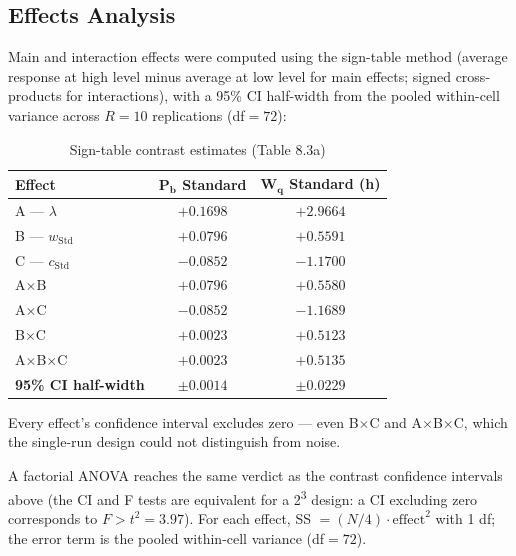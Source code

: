 \documentclass[11pt,a4paper]{article}
\newcommand{\Wq}{\ensuremath{W_q}}
\newcommand{\Pb}{\ensuremath{P_b}}
\newcommand{\lam}{\ensuremath{\lambda}}
\begin{document}
\subsection{Effects Analysis}

Main and interaction effects were computed using the sign-table method (average response at high level
minus average at low level for main effects; signed cross-products for interactions), with a 95\% CI
half-width from the pooled within-cell variance across $R=10$ replications (df$=72$):

\begin{table}[H]
\centering
\caption{Sign-table contrast estimates (Table 8.3a)}
\begin{tabular}{lcc}
\toprule
\textbf{Effect} & $\boldsymbol{\Pb}$ \textbf{Standard} & $\boldsymbol{\Wq}$ \textbf{Standard (h)} \\
\midrule
A --- $\lam$          & $+0.1698$ & $+2.9664$ \\
B --- $w_\text{Std}$  & $+0.0796$ & $+0.5591$ \\
C --- $c_\text{Std}$  & $-0.0852$ & $-1.1700$ \\
A$\times$B            & $+0.0796$ & $+0.5580$ \\
A$\times$C            & $-0.0852$ & $-1.1689$ \\
B$\times$C            & $+0.0023$ & $+0.5123$ \\
A$\times$B$\times$C   & $+0.0023$ & $+0.5135$ \\
\midrule
\textbf{95\% CI half-width} & $\pm 0.0014$ & $\pm 0.0229$ \\
\bottomrule
\end{tabular}
\end{table}

Every effect's confidence interval excludes zero — even B$\times$C and A$\times$B$\times$C, which the
single-run design could not distinguish from noise.

A factorial ANOVA reaches the same verdict as the contrast confidence intervals above (the CI and F
tests are equivalent for a 2\textsuperscript{3} design: a CI excluding zero corresponds to $F > t^2 =
3.97$). For each effect, SS $= (N/4) \cdot \text{effect}^2$ with 1 df; the error term is the pooled
within-cell variance (df$=72$).
\end{document}
